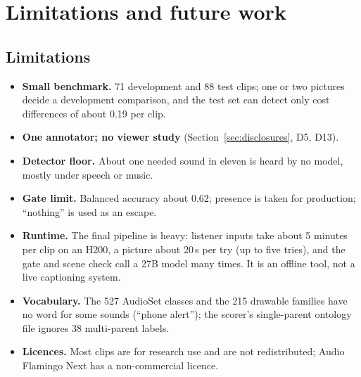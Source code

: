 \section{Limitations and future work}\label{sec:limits}

\subsection{Limitations}
\begin{itemize}
  \item \textbf{Small benchmark.} 71 development and 88 test clips; one or two pictures decide a development
        comparison, and the test set can detect only cost differences of about 0.19 per clip.
  \item \textbf{One annotator; no viewer study} (Section~\ref{sec:disclosures}, D5, D13).
  \item \textbf{Detector floor.} About one needed sound in eleven is heard by no model, mostly under speech or music.
  \item \textbf{Gate limit.} Balanced accuracy about 0.62; presence is taken for production; ``nothing'' is used as an
        escape.
  \item \textbf{Runtime.} The final pipeline is heavy: listener inputs take about 5 minutes per clip on an H200,
        a picture about 20\,s per try (up to five tries), and the gate and scene check call a 27B model many times.
        It is an offline tool, not a live captioning system.
  \item \textbf{Vocabulary.} The 527 AudioSet classes and the 215 drawable families have no word for some sounds
        (``phone alert''); the scorer's single-parent ontology file ignores 38 multi-parent labels.
  \item \textbf{Licences.} Most clips are for research use and are not redistributed; Audio Flamingo Next has a
        non-commercial licence.
\end{itemize}


